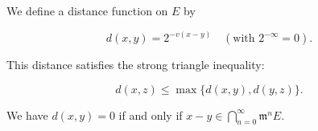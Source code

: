 We define a distance function on $E$ by

$$d(x, y) = 2^{-v(x-y)} \quad (\text{with } 2^{-\infty} = 0).$$

This distance satisfies the strong triangle inequality:

$$d(x, z) \leq \max\{d(x, y), d(y, z)\}.$$

We have $d(x, y) = 0$ if and only if $x - y \in \bigcap_{n=0}^{\infty} \mathfrak{m}^n E$.